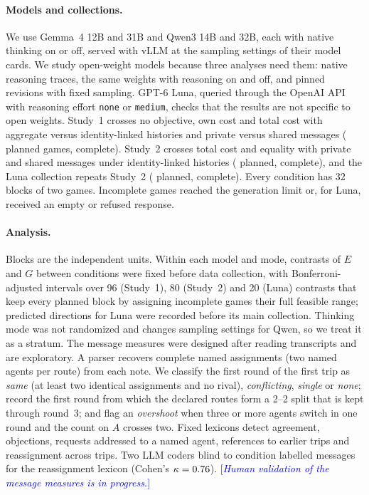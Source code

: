 \documentclass[11pt]{article}
\newcommand{\pending}[1]{\textcolor{blue}{[\textit{#1}]}}
\begin{document}
\paragraph{Models and collections.}
We use Gemma~4 12B and 31B and Qwen3 14B and 32B, each with native thinking on or off, served with vLLM at the sampling settings of their model cards. We study open-weight models because three analyses need them: native reasoning traces, the same weights with reasoning on and off, and pinned revisions with fixed sampling. GPT-6 Luna, queried through the OpenAI API with reasoning effort \texttt{none} or \texttt{medium}, checks that the results are not specific to open weights. Study~1 crosses no objective, own cost and total cost with aggregate versus identity-linked histories and private versus shared messages (\SOnePlanned{} planned games, \SOneValid{} complete). Study~2 crosses total cost and equality with private and shared messages under identity-linked histories (\STwoPlanned{} planned, \STwoValid{} complete), and the Luna collection repeats Study~2 (\LunaPlanned{} planned, \LunaValid{} complete). Every condition has 32 blocks of two games. Incomplete games reached the generation limit or, for Luna, received an empty or refused response.

\paragraph{Analysis.}
Blocks are the independent units. Within each model and mode, contrasts of $E$ and $G$ between conditions were fixed before data collection, with Bonferroni-adjusted intervals over 96 (Study~1), 80 (Study~2) and 20 (Luna) contrasts that keep every planned block by assigning incomplete games their full feasible range; predicted directions for Luna were recorded before its main collection. Thinking mode was not randomized and changes sampling settings for Qwen, so we treat it as a stratum. The message measures were designed after reading transcripts and are exploratory. A parser recovers complete named assignments (two named agents per route) from each note. We classify the first round of the first trip as \emph{same} (at least two identical assignments and no rival), \emph{conflicting}, \emph{single} or \emph{none}; record the first round from which the declared routes form a 2--2 split that is kept through round~3; and flag an \emph{overshoot} when three or more agents switch in one round and the count on $A$ crosses two. Fixed lexicons detect agreement, objections, requests addressed to a named agent, references to earlier trips and reassignment across trips. Two LLM coders blind to condition labelled \AuditItems{} messages for the reassignment lexicon (Cohen's $\kappa=0.76$). \pending{Human validation of the message measures is in progress.}
\end{document}
